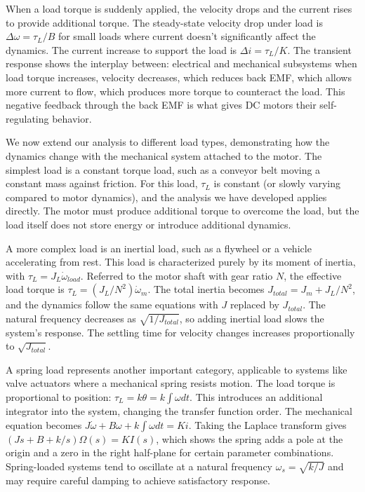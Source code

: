When a load torque is suddenly applied, the velocity drops and the current rises to provide additional torque. The steady-state velocity drop under load is $\Delta\omega = \tau_L / B$ for small loads where current doesn't significantly affect the dynamics. The current increase to support the load is $\Delta i = \tau_L / K$. The transient response shows the interplay between: electrical and mechanical subsystems when load torque increases, velocity decreases, which reduces back EMF, which allows more current to flow, which produces more torque to counteract the load. This negative feedback through the back EMF is what gives DC motors their self-regulating behavior.

We now extend our analysis to different load types, demonstrating how the dynamics change with the mechanical system attached to the motor. The simplest load is a constant torque load, such as a conveyor belt moving a constant mass against friction. For this load, $\tau_L$ is constant (or slowly varying compared to motor dynamics), and the analysis we have developed applies directly. The motor must produce additional torque to overcome the load, but the load itself does not store energy or introduce additional dynamics.

A more complex load is an inertial load, such as a flywheel or a vehicle accelerating from rest. This load is characterized purely by its moment of inertia, with $\tau_L = J_L \dot{\omega}_{load}$. Referred to the motor shaft with gear ratio $N$, the effective load torque is $\tau_L = (J_L / N^2) \dot{\omega}_m$. The total inertia becomes $J_{total} = J_m + J_L / N^2$, and the dynamics follow the same equations with $J$ replaced by $J_{total}$. The natural frequency decreases as $\sqrt{1/J_{total}}$, so adding inertial load slows the system's response. The settling time for velocity changes increases proportionally to $\sqrt{J_{total}}$.

A spring load represents another important category, applicable to systems like valve actuators where a mechanical spring resists motion. The load torque is proportional to position: $\tau_L = k \theta = k \int \omega dt$. This introduces an additional integrator into the system, changing the transfer function order. The mechanical equation becomes $J \dot{\omega} + B\omega + k \int \omega dt = K i$. Taking the Laplace transform gives $(Js + B + k/s) \Omega(s) = K I(s)$, which shows the spring adds a pole at the origin and a zero in the right half-plane for certain parameter combinations. Spring-loaded systems tend to oscillate at a natural frequency $\omega_s = \sqrt{k/J}$ and may require careful damping to achieve satisfactory response.

